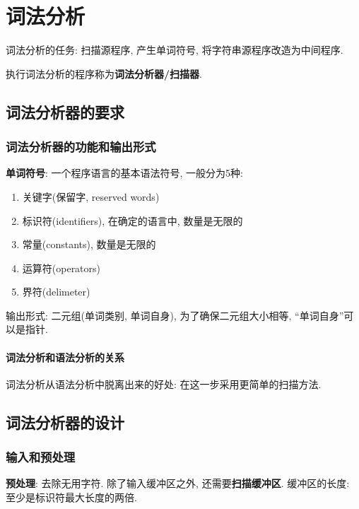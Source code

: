 \chapter{词法分析}

词法分析的任务: 扫描源程序, 产生单词符号, 将字符串源程序改造为中间程序.

执行词法分析的程序称为\textbf{词法分析器/扫描器}.

\section{词法分析器的要求}

    \subsection{词法分析器的功能和输出形式}

        \textbf{单词符号}: 一个程序语言的基本语法符号, 一般分为5种:

        \begin{enumerate}
            \item 关键字(保留字, reserved words)
            \item 标识符(identifiers), 在确定的语言中, 数量是无限的
            \item 常量(constants), 数量是无限的
            \item 运算符(operators)
            \item 界符(delimeter)
        \end{enumerate}

        输出形式: 二元组(单词类别, 单词自身), 为了确保二元组大小相等, ``单词自身''可以是指针.

        \subsubsection{词法分析和语法分析的关系}

            词法分析从语法分析中脱离出来的好处: 在这一步采用更简单的扫描方法.
    
\section{词法分析器的设计}

    \subsection{输入和预处理}

        \textbf{预处理}: 去除无用字符. 除了输入缓冲区之外, 还需要\textbf{扫描缓冲区}. 缓冲区的长度: 至少是标识符最大长度的两倍.

